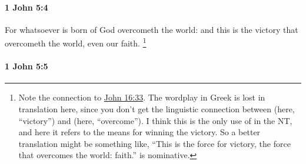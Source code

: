 		\paragraph{1 John 5:4} %
			\label{1JOHN-5-4}

			For whatsoever is born of God overcometh the world: and this is the victory that overcometh the world, even our faith.%
				\footnote{%
					Note the connection to \hyperref[JOHN-16-33]{John 16:33}. The wordplay in Greek is lost in translation here, since you don't get the linguistic connection between \hyperref[NIKE]{} (here, ``victory'') and \hyperref[NIKAO]{} (here, ``overcome''). I think this is the only use of \hyperref[NIKE]{} in the NT, and here it refers to the means for winning the victory. So a better translation might be something like, ``This is the force for victory, the force that overcomes the world: faith.''  is nominative.
					}

			\begin{framed}
			\scriptsize
				\begin{compactdesc}
					\item[SBLG]  \hyperref[NIKAO]{}  \hyperref[NIKE]{}  \hyperref[NIKAO]{} 
				\end{compactdesc}
			\end{framed}

		\paragraph{1 John 5:5} %
			\label{1JOHN-5-5}


